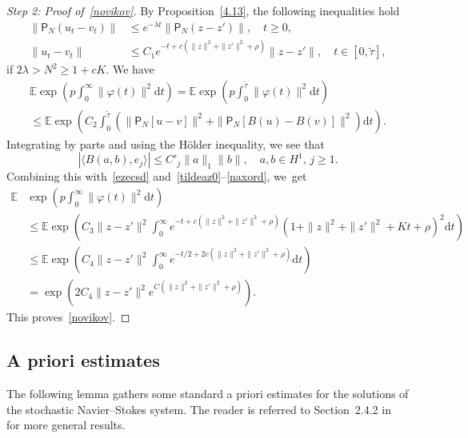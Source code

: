 \documentclass[AHL,Unicode,longabstracts]{cedram}
\newcommand{\ph}{\varphi}
\newcommand{\E}{{\mathbb E}}
\newcommand{\la}{\lambda}
\newcommand{\pp}{{{\mathsf P}_N}}
\newcommand{\lag}{\langle}
\newcommand{\rag}{\rangle}
\newcommand{\dd}{\mathrm{d}}
\begin{document}
\begin{proofc}
\begin{proof}[Step 2: Proof of~\eqref{novikov}]
By Proposition~\ref{4.13}, the following inequalities hold
\begin{align}
\|\pp(u_t-v_t)\| &\le e^{- \lambda t}\|\pp(z-z') \|, \quad t\ge0,\label{tildeaz0}
\\
\|u_t-v_t \|&\leq C_{1} e^{- t+c (\|z\|^2+\|z'\|^2+ \rho)}\|z-z'\|, \quad t\in [0,\tilde \tau],\label{tildeaz}
\end{align}
if $2\la>N^2\ge1+cK$. We have
\begin{multline}\label{naxord}
\E\exp\left(p\int_0^\infty \|\ph (t)\|^2\dd t\right) =\E\exp\left(p\int_0^{\tilde\tau} \|\ph(t)\|^2\dd t\right)\\
\leq\E\exp\left(C_2\int_0^{\tilde\tau}\left(\| {\mathsf P}_N[u-v]\|^2+\| {\mathsf P}_N[B(u)-B(v)]\|^2\right)\dd t\right).
\end{multline}
Integrating by parts and using the H\"older inequality, we see that
\[
|\lag B(a,b), e_j\rag| \le C'_j\|a\|_1 \|b\|, \quad a,b\in H^1, \, j\ge1.
\]
Combining this with~\eqref{ezecsd} and~\eqref{tildeaz0}--\eqref{naxord}, we~get
\begin{align*}
\E&\exp\left(p\int_0^\infty \|\ph (t)\|^2\dd t\right)\\
&\leq\E\exp\left(C_3\|z-z'\|^2\int_0^\infty e^{- t+c (\|z\|^2+\|z'\|^2+ \rho)}(1+\|z\|^2+\|z'\|^2+Kt+\rho)^2\dd t\right)\\&\le\E\exp\left(C_4\|z-z'\|^2\int_0^\infty e^{- t/2+2c (\|z\|^2+\|z'\|^2+ \rho)} \dd t\right)\\&=\exp\left(2C_{4}\|z-z'\|^2 e^{C(\|z\|^2+\|z'\|^2+\rho)} \right).
\end{align*}
This proves~\eqref{novikov}.
\end{proof}
\let\qed\relax
\end{proofc}

\subsection{A priori estimates}\label{S:5.1}

The following lemma gathers some standard a priori estimates for the solutions of the stochastic Navier--Stokes system. The reader is referred to Section~2.4.2 in~\cite{KS-book} for more general results.
\end{document}
